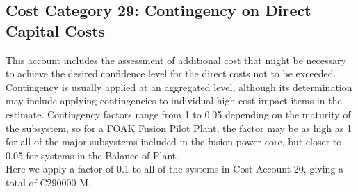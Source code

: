 \subsection{Cost Category 29: Contingency on Direct Capital Costs}

This account includes the assessment of additional
cost that might be necessary to achieve the desired confidence level for the direct costs not to be
exceeded. Contingency is usually applied at an aggregated level, although its determination may
include applying contingencies to individual high-cost-impact items in the estimate. 
Contingency factors range from 1 to 0.05 depending on the maturity of the subsystem, so for 
a FOAK Fusion Pilot Plant, the factor may be as high as 1 for all of the major subsystems
included in the fusion power core, but closer to 0.05 for systems in the Balance of Plant.  \\

Here we apply a factor of 0.1 to all of the systems in Cost Account 20, giving a total of 
C290000 M.

